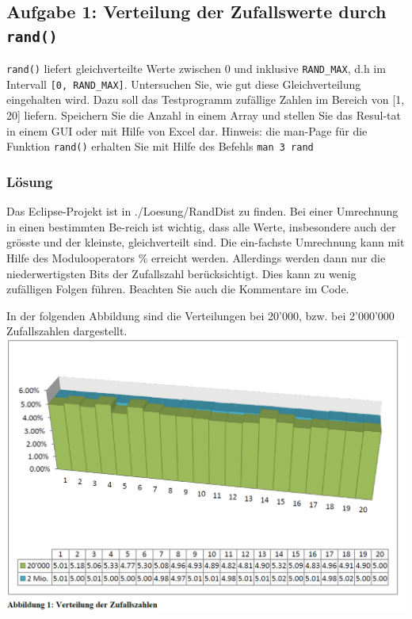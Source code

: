 \subsection{Aufgabe 1: Verteilung der Zufallswerte durch \texttt{rand()}}

\texttt{rand()} liefert gleichverteilte Werte zwischen 0 und inklusive \texttt{RAND\_MAX}, d.h im Intervall \texttt{[0, RAND\_MAX]}. Untersuchen Sie, wie gut diese Gleichverteilung eingehalten wird. Dazu soll das Testprogramm zufällige Zahlen im Bereich von [1, 20] liefern. Speichern Sie die Anzahl in einem Array und stellen Sie das Resul-tat in einem GUI oder mit Hilfe von Excel dar.
Hinweis: die man-Page für die Funktion \texttt{rand()} erhalten Sie mit Hilfe des Befehls \texttt{man 3 rand}

\subsubsection{Lösung}

Das Eclipse-Projekt ist in ./Loesung/RandDist zu finden. Bei einer Umrechnung in einen bestimmten Be-reich ist wichtig, dass alle Werte, insbesondere auch der grösste und der kleinste, gleichverteilt sind. Die ein-fachste Umrechnung kann mit Hilfe des Modulooperators \% erreicht werden. Allerdings werden dann nur die niederwertigsten Bits der Zufallszahl berücksichtigt. Dies kann zu wenig zufälligen Folgen führen. Beachten Sie auch die Kommentare im Code.

In der folgenden Abbildung sind die Verteilungen bei 20'000, bzw. bei 2'000'000 Zufallszahlen dargestellt.
\includegraphics[width=.8\linewidth]{900-Praktika/prak04/pic.PNG}




